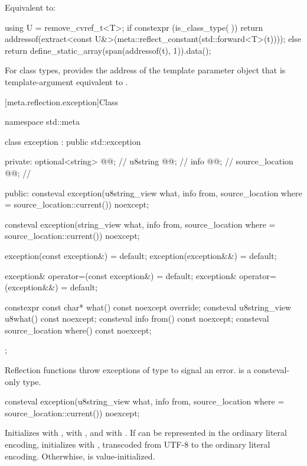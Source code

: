 \begin{itemdescr}
\pnum
\effects
Equivalent to:
\begin{codeblock}
using U = remove_cvref_t<T>;
if constexpr (is_class_type(^^U)) {
  return addressof(extract<const U&>(meta::reflect_constant(std::forward<T>(t))));
} else {
  return define_static_array(span(addressof(t), 1)).data();
}
\end{codeblock}

\pnum
\begin{note}
For class types,
 provides
the address of the template parameter object
that is template-argument equivalent to .
\end{note}
\end{itemdescr}

[meta.reflection.exception]{Class }

%
\begin{codeblock}
namespace std::meta {
  class exception : public std::exception {
  private:
    optional<string> @@;     // \expos
    u8string @@;           // \expos
    info @@;                 // \expos
    source_location @@;     // \expos

  public:
    consteval exception(u8string_view what, info from,
                        source_location where = source_location::current()) noexcept;

    consteval exception(string_view what, info from,
                        source_location where = source_location::current()) noexcept;

    exception(const exception&) = default;
    exception(exception&&) = default;

    exception& operator=(const exception&) = default;
    exception& operator=(exception&&) = default;

    constexpr const char* what() const noexcept override;
    consteval u8string_view u8what() const noexcept;
    consteval info from() const noexcept;
    consteval source_location where() const noexcept;
  };
}
\end{codeblock}

\pnum
Reflection functions throw exceptions of type 
to signal an error.
 is a consteval-only type.

%
\begin{itemdecl}
consteval exception(u8string_view what, info from,
                    source_location where = source_location::current()) noexcept;
\end{itemdecl}
\begin{itemdescr}
\pnum
\effects
Initializes
 with ,
 with , and
 with .
If  can be represented in the ordinary literal encoding,
initializes  with ,
transcoded from UTF-8 to the ordinary literal encoding.
Otherwhise,  is value-initialized.
\end{itemdescr}

